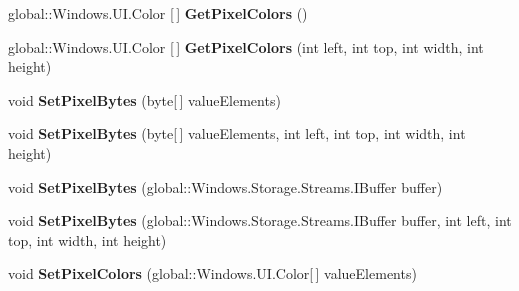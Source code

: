 \begin{DoxyCompactItemize}
\item 
\mbox{\label{interface_microsoft_1_1_graphics_1_1_canvas_1_1_i_canvas_bitmap_ad6aeb3bf7ad3092e46d6a3133472b1d1}} 
global\+::\+Windows.\+U\+I.\+Color \mbox{[}$\,$\mbox{]} {\bfseries Get\+Pixel\+Colors} ()
\item 
\mbox{\label{interface_microsoft_1_1_graphics_1_1_canvas_1_1_i_canvas_bitmap_ac162dc28f7d3a5de4034936d417c24e5}} 
global\+::\+Windows.\+U\+I.\+Color \mbox{[}$\,$\mbox{]} {\bfseries Get\+Pixel\+Colors} (int left, int top, int width, int height)
\item 
\mbox{\label{interface_microsoft_1_1_graphics_1_1_canvas_1_1_i_canvas_bitmap_a811bec820a040dca5292270d03b6431f}} 
void {\bfseries Set\+Pixel\+Bytes} (byte\mbox{[}$\,$\mbox{]} value\+Elements)
\item 
\mbox{\label{interface_microsoft_1_1_graphics_1_1_canvas_1_1_i_canvas_bitmap_af373b13151ccbea6a489af0b71c86b6d}} 
void {\bfseries Set\+Pixel\+Bytes} (byte\mbox{[}$\,$\mbox{]} value\+Elements, int left, int top, int width, int height)
\item 
\mbox{\label{interface_microsoft_1_1_graphics_1_1_canvas_1_1_i_canvas_bitmap_a21c32cb7fb31c8fd6a1decdcb79876d2}} 
void {\bfseries Set\+Pixel\+Bytes} (global\+::\+Windows.\+Storage.\+Streams.\+I\+Buffer buffer)
\item 
\mbox{\label{interface_microsoft_1_1_graphics_1_1_canvas_1_1_i_canvas_bitmap_a593c5894545aa39d6cf008b46bef4972}} 
void {\bfseries Set\+Pixel\+Bytes} (global\+::\+Windows.\+Storage.\+Streams.\+I\+Buffer buffer, int left, int top, int width, int height)
\item 
\mbox{\label{interface_microsoft_1_1_graphics_1_1_canvas_1_1_i_canvas_bitmap_a925c9f849cf70be981d86d4e4aad1bd0}} 
void {\bfseries Set\+Pixel\+Colors} (global\+::\+Windows.\+U\+I.\+Color\mbox{[}$\,$\mbox{]} value\+Elements)

\end{DoxyCompactItemize}
